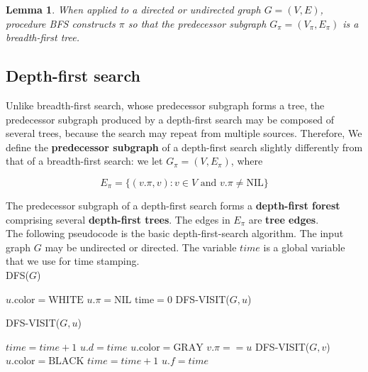 \documentclass[12pt]{article}
\newtheorem{lemma}[theorem]{Lemma}
\begin{document}
\begin{lemma}
  When applied to a directed or undirected graph $G = (V,E)$, procedure BFS constructs $\pi$ so that the predecessor subgraph $G_{\pi} = (V_{\pi}, E_{\pi})$ is a breadth-first tree.
\end{lemma}

\subsection{Depth-first search}

Unlike breadth-first search, whose predecessor subgraph forms a tree, the predecessor subgraph produced by a depth-first search may be composed of several trees, because the search may repeat from multiple sources. Therefore, We define the \textbf{predecessor subgraph} of a depth-first search slightly differently from that of a breadth-first search: we let $G_{\pi} = (V, E_{\pi})$, where

\begin{equation*}
  E_{\pi} = \{ (v.\pi, v) : v \in V \text{ and } v.\pi \neq \text{NIL} \}
\end{equation*}

The predecessor subgraph of a depth-first search forms a \textbf{depth-first forest} comprising several \textbf{depth-first trees}. The edges in $E_{\pi}$ are \textbf{tree edges}. \\

The following pseudocode is the basic depth-first-search algorithm. The input graph $G$ may be undirected or directed. The variable $time$ is a global variable that we use for time stamping. \\

DFS($G$)
\begin{algorithmic}[1]
	\State $u.\text{color} = \text{WHITE}$
	\State $u.\pi = \text{NIL}$
\EndFor
\State $\text{time} = 0$
		DFS-VISIT($G,u$)
	\EndIf
\EndFor
\end{algorithmic}

DFS-VISIT($G, u$)
\begin{algorithmic}[1]
\State $time = time + 1$
\State $u.d = time$
\State $u.\text{color} = \text{GRAY}$
		\State $v.\pi == u$
		\State DFS-VISIT($G,v$)
	\EndIf
\EndFor
\State $u.\text{color} = \text{BLACK}$
\State $time = time + 1$
\State $u.f = time$
\end{algorithmic}
\end{document}
